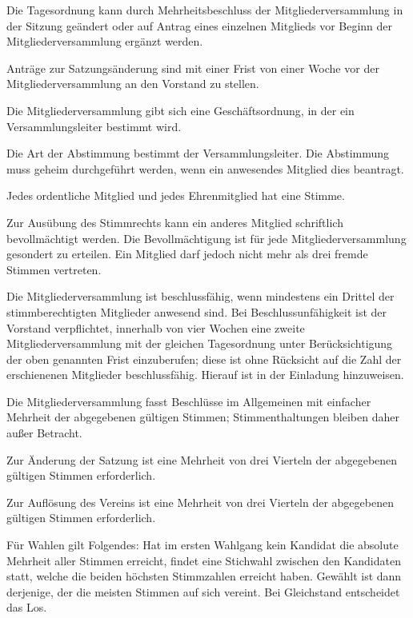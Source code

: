 \begin{contract}
 Die Tagesordnung kann durch Mehrheitsbeschluss der Mitgliederversammlung in der Sitzung geändert oder auf Antrag eines einzelnen Mitglieds vor Beginn der Mitgliederversammlung ergänzt werden.
	
 Anträge zur Satzungsänderung sind mit einer Frist von einer Woche vor der Mitgliederversammlung an den Vorstand zu stellen.
	
 Die Mitgliederversammlung gibt sich eine Geschäftsordnung, in der ein Versammlungsleiter bestimmt wird.
	
 Die Art der Abstimmung bestimmt der Versammlungsleiter. Die Abstimmung muss geheim durchgeführt werden, wenn ein anwesendes Mitglied dies beantragt.
	
 Jedes ordentliche Mitglied und jedes Ehrenmitglied hat eine Stimme.
	
 Zur Ausübung des Stimmrechts kann ein anderes Mitglied schriftlich bevoll\-mächtigt werden. Die Bevollmächtigung ist für jede Mitgliederversammlung gesondert zu erteilen. Ein Mitglied darf jedoch nicht mehr als drei fremde Stimmen vertreten.
	
 Die Mitgliederversammlung ist beschlussfähig, wenn mindestens ein Drittel der stimmberechtigten Mitglieder anwesend sind.
	Bei Beschlussunfähigkeit ist der Vorstand verpflichtet, innerhalb von vier Wochen eine zweite Mitglieder\-ver\-sammlung mit der gleichen Tagesordnung unter Berücksichtigung der oben genannten Frist einzuberufen; diese ist ohne Rücksicht auf die Zahl der erschienenen Mitglieder beschlussfähig. Hierauf ist in der Einladung hinzuweisen.
	
 Die Mitgliederversammlung fasst Beschlüsse im Allgemeinen mit einfacher Mehrheit der abgegebenen gültigen Stimmen; Stimmenthaltungen bleiben daher außer Betracht.
	
 Zur Änderung der Satzung ist eine Mehrheit von drei Vierteln der abgegebenen gültigen Stimmen erforderlich.
	
 Zur Auflösung des Vereins ist eine Mehrheit von drei Vierteln der abgegebenen gültigen Stimmen erforderlich.
	
 Für Wahlen gilt Folgendes: Hat im ersten Wahlgang kein Kandidat die absolute Mehrheit aller Stimmen erreicht, findet eine Stichwahl zwischen den Kandidaten statt, welche die beiden höchsten Stimmzahlen erreicht haben. Gewählt ist dann derjenige, der die meisten Stimmen auf sich vereint. Bei Gleichstand entscheidet das Los.
	

\end{contract}
